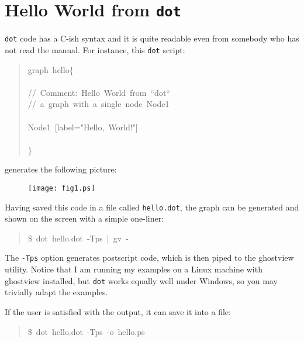 \documentclass[10pt,english]{article}
\begin{document}

\hypertarget{hello-world-from-dot}{}
\section*{Hello World from \texttt{dot}}

\texttt{dot} code has a C-ish syntax and it is quite readable even from somebody
who has not read the manual. For instance, this \texttt{dot} script:
\begin{quote}
\begin{ttfamily}\begin{flushleft}
\mbox{graph~hello{\{}}\\
\mbox{}\\
\mbox{//~Comment:~Hello~World~from~``dot``}\\
\mbox{//~a~graph~with~a~single~node~Node1}\\
\mbox{}\\
\mbox{Node1~[label="Hello,~World!"]}\\
\mbox{}\\
\mbox{{\}}}
\end{flushleft}\end{ttfamily}
\end{quote}

generates the following picture:
\begin{figure}

\texttt{[image: fig1.ps]}
\end{figure}

Having saved this code in a file called \texttt{hello.dot}, the graph can be 
generated and shown on the screen with a simple one-liner:
\begin{quote}
\begin{ttfamily}\begin{flushleft}
\mbox{{\$}~dot~hello.dot~-Tps~|~gv~-}
\end{flushleft}\end{ttfamily}
\end{quote}

The \texttt{-Tps} option generates postscript
code, which is then piped to the ghostview utility. Notice that 
I am running my examples on a Linux machine with ghostview installed, 
but \texttt{dot} works equally well under Windows, so you may trivially 
adapt the examples.

If the user is satisfied with the output, it can save it into a file:
\begin{quote}
\begin{ttfamily}\begin{flushleft}
\mbox{{\$}~dot~hello.dot~-Tps~-o~hello.ps}
\end{flushleft}\end{ttfamily}
\end{quote}
\end{document}

